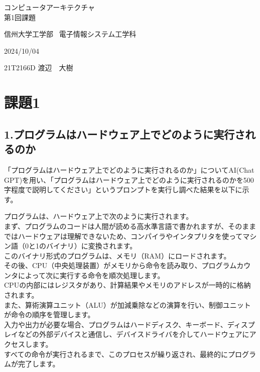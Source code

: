 \documentclass[a4paper,11pt,titlepage,dvipdfmx]{jsarticle}
\begin{document}
\begin{titlepage}
\noindent
\vspace{6cm}
\begin{center}
\begin{LARGE}
コンピュータアーキテクチャ \\
第1回課題 
\end{LARGE}
\end{center}
\vspace{6cm}
\begin{flushright}
信州大学工学部 \
電子情報システム工学科 \
\begin{description}
\setlength{\leftskip}{8.9cm}
\item 2024/10/04
\item 21T2166D 渡辺　大樹
\end{description}
\end{flushright}
\end{titlepage}


\section*{課題1}
\subsection*{1.プログラムはハードウェア上でどのように実行されるのか}
「プログラムはハードウェア上でどのように実行されるのか」についてAI(Chat GPT)を用い、「プログラムはハードウェア上でどのように実行されるのかを500字程度で説明してください」というプロンプトを実行し調べた結果を以下に示す。\\
\begin{shaded}
    プログラムは、ハードウェア上で次のように実行されます。\\
    まず、プログラムのコードは人間が読める高水準言語で書かれますが、そのままではハードウェアは理解できないため、コンパイラやインタプリタを使ってマシン語（0と1のバイナリ）に変換されます。\\
    このバイナリ形式のプログラムは、メモリ（RAM）にロードされます。\\
    その後、CPU（中央処理装置）がメモリから命令を読み取り、プログラムカウンタによって次に実行する命令を順次処理します。\\
    CPUの内部にはレジスタがあり、計算結果やメモリのアドレスが一時的に格納されます。\\
    また、算術演算ユニット（ALU）が加減乗除などの演算を行い、制御ユニットが命令の順序を管理します。\\
    入力や出力が必要な場合、プログラムはハードディスク、キーボード、ディスプレイなどの外部デバイスと通信し、デバイスドライバを介してハードウェアにアクセスします。\\
    すべての命令が実行されるまで、このプロセスが繰り返され、最終的にプログラムが完了します。\\
\end{shaded}
\end{document}
